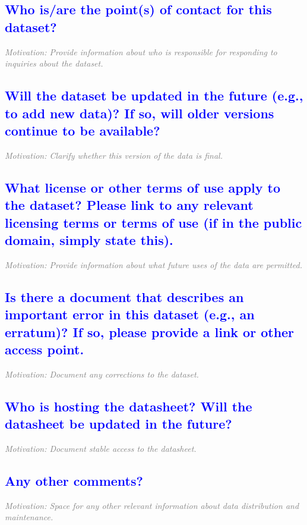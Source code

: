 \documentclass[letterpaper, 10 pt, transmag]{IEEEtran}
\begin{document}
\textcolor{blue}{\subsection{Who is/are the point(s) of contact for this dataset?}}
\textcolor{gray}{\textit{Motivation: Provide information about who is responsible for responding to inquiries about the dataset.}}

\textcolor{blue}{\subsection{Will the dataset be updated in the future (e.g., to add new data)? If so, will older versions continue to be available?}}
\textcolor{gray}{\textit{Motivation: Clarify whether this version of the data is final.}}

\textcolor{blue}{\subsection{What license or other terms of use apply to the dataset? Please link to any relevant licensing terms or terms of use (if in the public domain, simply state this).}}
\textcolor{gray}{\textit{Motivation: Provide information about what future uses of the data are permitted.}}

\textcolor{blue}{\subsection{Is there a document that describes an important error in this dataset (e.g., an erratum)? If so, please provide a link or other access point.}}
\textcolor{gray}{\textit{Motivation: Document any corrections to the dataset.}}

\textcolor{blue}{\subsection{Who is hosting the datasheet? Will the datasheet be updated in the future?}}
\textcolor{gray}{\textit{Motivation: Document stable access to the datasheet.}}

\textcolor{blue}{\subsection{Any other comments?}}
\textcolor{gray}{\textit{Motivation: Space for any other relevant information about data distribution and maintenance.}}
\vspace{10mm}
\end{document}
